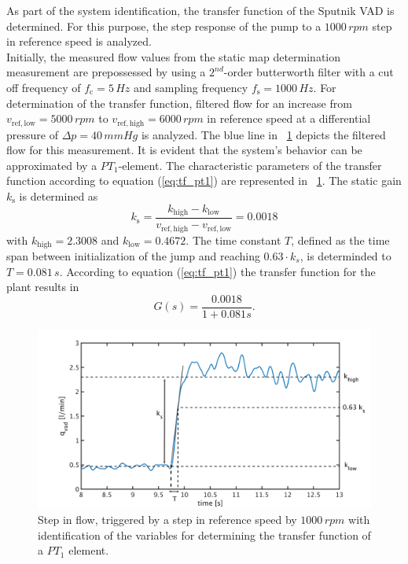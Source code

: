 As part of the system identification, the transfer function of the Sputnik VAD is determined. For this purpose, the step response of the pump to a $1000\,rpm$ step in reference speed is analyzed.
\\Initially, the measured flow values from the static map determination measurement are prepossessed by using a $2^{nd}$-order butterworth filter with a cut off frequency of $f_{\mathrm{c}} = 5\,Hz$ and sampling frequency $f_{\mathrm{s}}=1000 \, Hz$. For determination of the transfer function, filtered flow for an increase from $v_{\mathrm{ref,low}}=5000\,rpm$ to $v_{\mathrm{ref,high}}=6000\,rpm$ in reference speed at a differential pressure of $\Delta{p}=40\,mmHg$ is analyzed. The blue line in \figurename~\ref{fig:plant} depicts the filtered flow for this measurement. It is evident that the system's behavior can be approximated by a $PT_1$-element.
 The characteristic parameters of the transfer function according to equation (\ref{eq:tf_pt1}) are represented in \figurename~\ref{fig:plant}. The static gain $k_{\mathrm{s}}$ is determined as
\begin{equation}
  k_{\mathrm{s}} = \frac{k_{\mathrm{high}}-k_{\mathrm{low}}}{v_{\mathrm{ref,high}}-v_{\mathrm{ref,low}}}=0.0018
\label{eq:k_s_1}
\end{equation}
with $k_{\mathrm{high}}=2.3008$ and $k_{\mathrm{low}}=0.4672$. The time constant $T$, defined as the time span between initialization of the jump and reaching $0.63 \cdot k_s$, is determinded to $T=0.081\,s$.
According to equation (\ref{eq:tf_pt1}) the transfer function for the plant results in
\begin{equation}
    G(s) = \frac{0.0018}{1+0.081s}.
 \label{eq:plant}
\end{equation}
\begin{figure}[ht!]
  \centering
  \includegraphics[width=\textwidth]{images/chapt_4/plant_generation.pdf}
  \caption[Transfer function of Sputnik VAD]{Step in flow, triggered by a step in reference speed by $1000\,rpm$ with identification of the variables for determining the transfer function of a $PT_{\mathrm{1}}$ element.}
  \label{fig:plant}
\end{figure}
